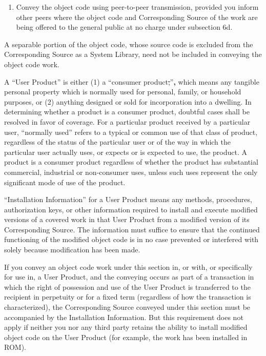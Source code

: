 \documentclass[11pt]{article}
\newcounter{v2section}
\newcounter{v3section}
\begin{document}
\begin{enumerate}
\item 

    Convey the object code using peer-to-peer transmission, provided you
    inform other peers where the object code and Corresponding Source of
    the work are being offered to the general public at no charge under
    subsection 6d.

\end{enumerate}

A separable portion of the object code, whose source code is excluded
from the Corresponding Source as a System Library, need not be
included in conveying the object code work.

A ``User Product'' is either (1) a ``consumer
product\sout{,}''\textbf{,} which means any tangible personal property
which is normally used for personal, family, or household purposes, or
(2) anything designed or sold for incorporation into a dwelling.  In
determining whether a product is a consumer product, doubtful cases
shall be resolved in favor of coverage.  For a particular product
received by a particular user, ``normally used'' refers to a typical or
common use of that class of product, regardless of the status of the
particular user or of the way in which the particular user actually
uses, or expects or is expected to use, the product.  A product is a
consumer product regardless of whether the product has substantial
commercial, industrial or non-consumer uses, unless such uses represent
the only significant mode of use of the product.

``Installation Information'' for a User Product means any methods,
procedures, authorization keys, or other information required to install
and execute modified versions of a covered work in that User Product
from a modified version of its Corresponding Source.  The information
must suffice to ensure that the continued functioning of the modified
object code is in no case prevented or interfered with solely because
modification has been made.

If you convey an object code work under this section in, or with, or
specifically for use in, a User Product, and the conveying occurs as
part of a transaction in which the right of possession and use of the
User Product is transferred to the recipient in perpetuity or for a
fixed term (regardless of how the transaction is characterized), the
Corresponding Source conveyed under this section must be accompanied
by the Installation Information.  But this requirement does not apply
if neither you nor any third party retains the ability to install
modified object code on the User Product (for example, the work has
been installed in ROM).
\end{document}
